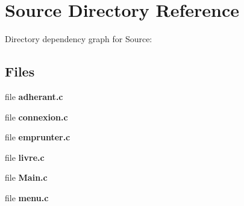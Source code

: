 \section{Source Directory Reference}
\label{dir_74389ed8173ad57b461b9d623a1f3867}
Directory dependency graph for Source\+:
\subsection*{Files}
\begin{DoxyCompactItemize}
\item 
file \textbf{ adherant.\+c}
\item 
file \textbf{ connexion.\+c}
\item 
file \textbf{ emprunter.\+c}
\item 
file \textbf{ livre.\+c}
\item 
file \textbf{ Main.\+c}
\item 
file \textbf{ menu.\+c}
\end{DoxyCompactItemize}
